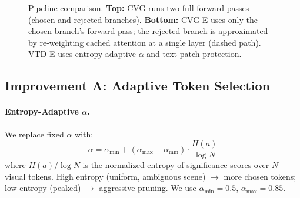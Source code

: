 \documentclass[10pt,twocolumn]{article}
\begin{document}
\begin{figure}[t]
\caption{Pipeline comparison. \textbf{Top:} CVG runs two full forward passes (chosen and rejected branches). \textbf{Bottom:} CVG-E uses only the chosen branch's forward pass; the rejected branch is approximated by re-weighting cached attention at a single layer (dashed path). VTD-E uses entropy-adaptive $\alpha$ and text-patch protection.}
\label{fig:pipeline}
\end{figure}

\subsection{Improvement A: Adaptive Token Selection}

\paragraph{Entropy-Adaptive $\alpha$.} We replace fixed $\alpha$ with:
\begin{equation}
\alpha = \alpha_{\min} + (\alpha_{\max} - \alpha_{\min}) \cdot \frac{H(a)}{\log N} \label{eq:alpha}
\end{equation}
where $H(a)/\log N$ is the normalized entropy of significance scores over $N$ visual tokens. High entropy (uniform, ambiguous scene) $\to$ more chosen tokens; low entropy (peaked) $\to$ aggressive pruning. We use $\alpha_{\min}=0.5$, $\alpha_{\max}=0.85$.
\end{document}
